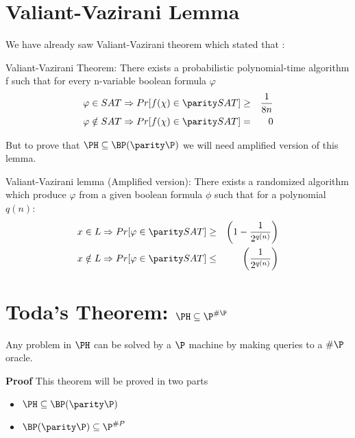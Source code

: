 \documentclass[11pt]{article}
\begin{document}
  
\section{Valiant-Vazirani Lemma}
We have already saw Valiant-Vazirani theorem which stated that :
\begin{lemma} Valiant-Vazirani Theorem: There exists a probabilistic
polynomial-time algorithm f such that for every n-variable boolean
formula $\varphi$
\begin{eqnarray*}
  \varphi\in SAT\Rightarrow Pr[f(\chi)\in \parity SAT] &\geq& \frac{1}{8n} \\
  \varphi\notin SAT\Rightarrow Pr[f(\chi)\in \parity SAT] &=& 0
\end{eqnarray*}
\end{lemma}
But to prove that $\PH \subseteq \BP(\parity\P)$ we will need
amplified version of this lemma.
\begin{lemma}
Valiant-Vazirani lemma (Amplified version): There exists a randomized
algorithm which produce $\varphi$ from a given boolean formula $\phi$
such that for a polynomial $q(n)$:
\begin{eqnarray*}
  x\in L \Rightarrow Pr[\varphi\in \parity SAT] &\geq&
  \left(1-\frac{1}{2^{q(n)}}\right) \\ 
  x\notin L \Rightarrow Pr[\varphi\in \parity SAT] &\leq& \left(\frac{1}{2^{q(n)}}\right)
\end{eqnarray*}
\end{lemma}

\section{Toda's Theorem: $\PH\subseteq\P^{\#\P}$} Any problem in $\PH$
can be solved by a $\P$ machine by making queries to a $\#\P$ oracle.\newline

\textbf{Proof} \newline
This theorem will be proved in two parts
\begin{itemize}
 \item 
 $\PH\subseteq\BP(\parity\P)$
 \item
 $\BP(\parity\P) \subseteq \P^{\#P}$
\end{itemize}
\end{document}
